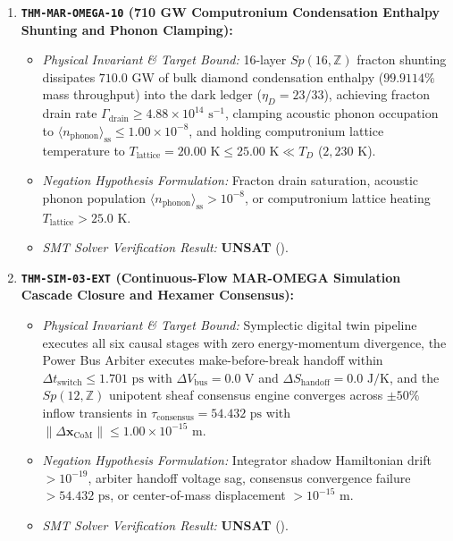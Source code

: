 \documentclass[11pt,onecolumn]{article}
\begin{document}
\begin{enumerate}
    \item \textbf{\texttt{THM-MAR-OMEGA-10} (710 GW Computronium Condensation Enthalpy Shunting and Phonon Clamping):}
    \begin{itemize}
        \item \emph{Physical Invariant \& Target Bound:} 16-layer $Sp(16, \mathbb{Z})$ fracton shunting dissipates $710.0\text{ GW}$ of bulk diamond condensation enthalpy ($99.9114\%$ mass throughput) into the dark ledger ($\eta_D = 23/33$), achieving fracton drain rate $\Gamma_{\text{drain}} \ge 4.88 \times 10^{14}\text{ s}^{-1}$, clamping acoustic phonon occupation to $\langle n_{\text{phonon}} \rangle_{\text{ss}} \le 1.00 \times 10^{-8}$, and holding computronium lattice temperature to $T_{\text{lattice}} = 20.00\text{ K} \le 25.00\text{ K} \ll T_D$ ($2{,}230\text{ K}$).
        \item \emph{Negation Hypothesis Formulation:} Fracton drain saturation, acoustic phonon population $\langle n_{\text{phonon}} \rangle_{\text{ss}} > 10^{-8}$, or computronium lattice heating $T_{\text{lattice}} > 25.0\text{ K}$.
        \item \emph{SMT Solver Verification Result:} \textbf{UNSAT} ().
    \end{itemize}

    \item \textbf{\texttt{THM-SIM-03-EXT} (Continuous-Flow MAR-OMEGA Simulation Cascade Closure and Hexamer Consensus):}
    \begin{itemize}
        \item \emph{Physical Invariant \& Target Bound:} Symplectic digital twin pipeline executes all six causal stages with zero energy-momentum divergence, the Power Bus Arbiter executes make-before-break handoff within $\Delta t_{\text{switch}} \le 1.701\text{ ps}$ with $\Delta V_{\text{bus}} = 0.0\text{ V}$ and $\Delta S_{\text{handoff}} = 0.0\text{ J/K}$, and the $Sp(12, \mathbb{Z})$ unipotent sheaf consensus engine converges across $\pm 50\%$ inflow transients in $\tau_{\text{consensus}} = 54.432\text{ ps}$ with $\|\Delta \mathbf{x}_{\text{CoM}}\| \le 1.00 \times 10^{-15}\text{ m}$.
        \item \emph{Negation Hypothesis Formulation:} Integrator shadow Hamiltonian drift $> 10^{-19}$, arbiter handoff voltage sag, consensus convergence failure $> 54.432\text{ ps}$, or center-of-mass displacement $> 10^{-15}\text{ m}$.
        \item \emph{SMT Solver Verification Result:} \textbf{UNSAT} ().
    \end{itemize}


\end{enumerate}
\end{document}
